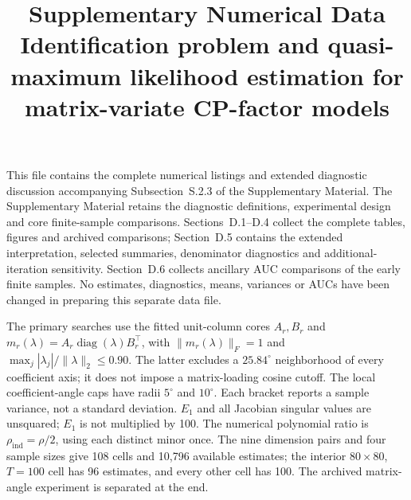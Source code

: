 \documentclass[12pt,letterpaper]{article}
\def\spacingset#1{\renewcommand{\baselinestretch}{#1}\small\normalsize}
\theoremstyle{plain}
\theoremstyle{definition}
\begin{document}
\spacingset{1}
\title{\bfseries Supplementary Numerical Data\\[4pt]
\large Identification problem and quasi-maximum likelihood estimation
for matrix-variate CP-factor models}
\author{}
\date{}
\maketitle
\noindent This file contains the complete numerical listings and extended
diagnostic discussion accompanying Subsection~S.2.3 of the Supplementary
Material. The Supplementary Material retains the diagnostic definitions,
experimental design and core finite-sample comparisons. Sections~D.1--D.4
collect the complete tables, figures and archived comparisons; Section~D.5
contains the extended interpretation, selected summaries, denominator
diagnostics and additional-iteration sensitivity. Section~D.6
collects ancillary AUC comparisons of the early finite samples.
No estimates, diagnostics, means, variances or AUCs have been changed
in preparing this separate data file.

\medskip\noindent The primary searches use the fitted unit-column cores
$A_r,B_r$ and $m_r(\lambda)=A_r\operatorname{diag}(\lambda)B_r^\top$,
with $\|m_r(\lambda)\|_F=1$ and
$\max_j|\lambda_j|/\|\lambda\|_2\le0.90$.
The latter excludes a $25.84^\circ$ neighborhood of every coefficient axis;
it does not impose a matrix-loading cosine cutoff. The local coefficient-angle
caps have radii $5^\circ$ and $10^\circ$.
Each bracket reports a sample variance, not a standard deviation.
$E_1$ and all Jacobian singular values are unsquared; $E_1$ is not
multiplied by 100. The numerical polynomial ratio is
$\rho_{\mathrm{ind}}=\rho/2$, using each distinct minor once.
The nine dimension pairs and four sample sizes give 108 cells and
10,796 available estimates; the interior $80\times80$, $T=100$ cell
has 96 estimates, and every other cell has 100.
The archived matrix-angle experiment is separated at the end.

\tableofcontents
\clearpage
\end{document}
